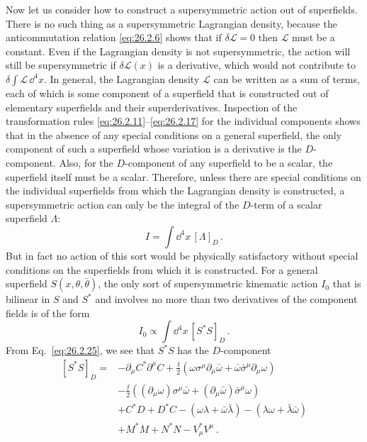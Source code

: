Now let us consider how to construct a supersymmetric action out of
superfields. There is no such thing as a supersymmetric Lagrangian density,
because the anticommutation relation \eqref{eq:26.2.6} shows that if
$\delta\mathcal{L}=0$ then $\mathcal{L}$ must be a constant. Even if the
Lagrangian density is not supersymmetric, the action will still be
supersymmetric if $\delta\mathcal{L}(x)$ is a derivative, which would not
contribute to $\delta\int\mathcal{L}\,\dd^4x$. In general, the Lagrangian
density $\mathcal{L}$ can be written as a sum of terms, each of which is some
component of a superfield that is constructed out of elementary superfields
and their superderivatives. Inspection of the transformation rules
\eqref{eq:26.2.11}--\eqref{eq:26.2.17} for the individual components shows
that in the absence of any special conditions on a general superfield, the
only component of such a superfield whose variation is a derivative is the
$D$-component. Also, for the $D$-component of any superfield to be a scalar,
the superfield itself must be a scalar. Therefore, unless there are special
conditions on the individual superfields from which the Lagrangian density is
constructed, a supersymmetric action can only be the integral of the
$D$-term of a scalar superfield $\Lambda$:
\begin{equation}
  I=\int \dd^4x\,[\Lambda]_D\,.
  \tag{26.2.31}\label{eq:26.2.31}
\end{equation}
But in fact no action of this sort would be physically satisfactory without
special conditions on the superfields from which it is constructed. For a
general superfield \(S(x,\theta,\bar\theta)\), the only sort of
supersymmetric kinematic
action $I_0$ that is bilinear in $S$ and $S^*$ and involves no more than two
derivatives of the component fields is of the form
\begin{equation}
  I_0\mathrel{\propto}\int \dd^4x\,[S^*S]_D\,.
  \tag{26.2.32}\label{eq:26.2.32}
\end{equation}
From Eq.~\eqref{eq:26.2.25}, we see that $S^*S$ has the $D$-component
\begin{equation}
  \begin{aligned}
  [S^*S]_D={}&-\partial_\mu C^*\partial^\mu C
  +\frac{\ii}{2}\left(
    \omega\sigma^\mu\partial_\mu\bar\omega
    +\bar\omega\bar\sigma^\mu\partial_\mu\omega\right)\\
  &-\frac{\ii}{2}\left(
    (\partial_\mu\omega)\sigma^\mu\bar\omega
    +(\partial_\mu\bar\omega)\bar\sigma^\mu\omega\right)\\
  &+C^*D+D^*C
   -(\omega\lambda+\bar\omega\bar\lambda)
   -(\lambda\omega+\bar\lambda\bar\omega)\\
  &+M^*M+N^*N-V_\mu^*V^\mu\,.
  \end{aligned}
  \tag{26.2.33}\label{eq:26.2.33}
\end{equation}
